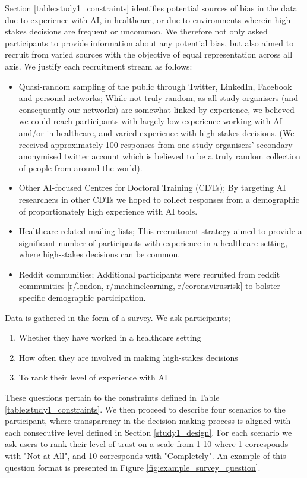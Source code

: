 \documentclass[manuscript,screen,review]{acmart}
\begin{document}
Section \ref{table:study1_constraints} identifies potential sources of bias in the data due to experience with AI, in healthcare, or due to environments wherein high-stakes decisions are frequent or uncommon. We therefore not only asked participants to provide information about any potential bias, but also aimed to recruit from varied sources with the objective of equal representation across all axis. We justify each recruitment stream as follows:

\begin{itemize}
    \item Quasi-random sampling of the public through Twitter, LinkedIn, Facebook and personal networks; While not truly random, as all study organisers (and consequently our networks) are somewhat linked by experience, we believed we could reach participants with largely low experience working with AI and/or in healthcare, and varied experience with high-stakes decisions. (We received approximately 100 responses from one study organisers' secondary anonymised twitter account which is believed to be a truly random collection of people from around the world).
    \item Other AI-focused Centres for Doctoral Training (CDTs); By targeting AI researchers in other CDTs we hoped to collect responses from a demographic of proportionately high experience with AI tools.
    \item Healthcare-related mailing lists; This recruitment strategy aimed to provide a significant number of participants with experience in a healthcare setting, where high-stakes decisions can be common.
    \item Reddit communities; Additional participants were recruited from reddit communities [r/london, r/machinelearning, r/coronavirusrisk] to bolster specific demographic participation.
\end{itemize}

Data is gathered in the form of a survey. We ask participants;

\begin{enumerate}
    \item Whether they have worked in a healthcare setting
    \item How often they are involved in making high-stakes decisions
    \item To rank their level of experience with AI
\end{enumerate}

These questions pertain to the constraints defined in Table \ref{table:study1_constraints}. We then proceed to describe four scenarios to the participant, where transparency in the decision-making process is aligned with each consecutive level defined in Section \ref{study1_design}. For each scenario we ask users to rank their level of trust on a scale from 1-10 where 1 corresponds with "Not at All", and 10 corresponds with "Completely". An example of this question format is presented in Figure \ref{fig:example_survey_question}.
\end{document}
